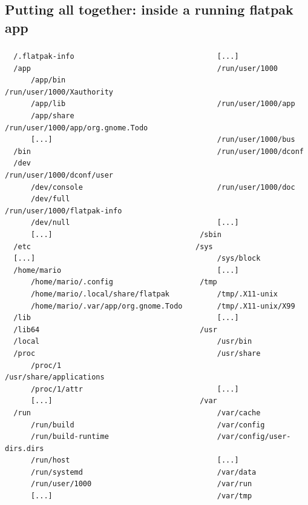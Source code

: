 \subsection{Putting all together: inside a running flatpak app}
\begin{frame}[fragile]
  \frametitle{\insertsubsection}

    \begin{tiny}
\begin{verbatim}
  /.flatpak-info                                 [...]
  /app                                           /run/user/1000
      /app/bin                                   /run/user/1000/Xauthority
      /app/lib                                   /run/user/1000/app
      /app/share                                 /run/user/1000/app/org.gnome.Todo
      [...]                                      /run/user/1000/bus
  /bin                                           /run/user/1000/dconf
  /dev                                           /run/user/1000/dconf/user
      /dev/console                               /run/user/1000/doc
      /dev/full                                  /run/user/1000/flatpak-info
      /dev/null                                  [...]
      [...]                                  /sbin
  /etc                                      /sys
  [...]                                          /sys/block
  /home/mario                                    [...]
      /home/mario/.config                    /tmp
      /home/mario/.local/share/flatpak           /tmp/.X11-unix
      /home/mario/.var/app/org.gnome.Todo        /tmp/.X11-unix/X99
  /lib                                           [...]
  /lib64                                     /usr
  /local                                         /usr/bin
  /proc                                          /usr/share
      /proc/1                                    /usr/share/applications
      /proc/1/attr                               [...]
      [...]                                  /var
  /run                                           /var/cache
      /run/build                                 /var/config
      /run/build-runtime                         /var/config/user-dirs.dirs
      /run/host                                  [...]
      /run/systemd                               /var/data
      /run/user/1000                             /var/run
      [...]                                      /var/tmp
\end{verbatim}
    \end{tiny}
\end{frame}

